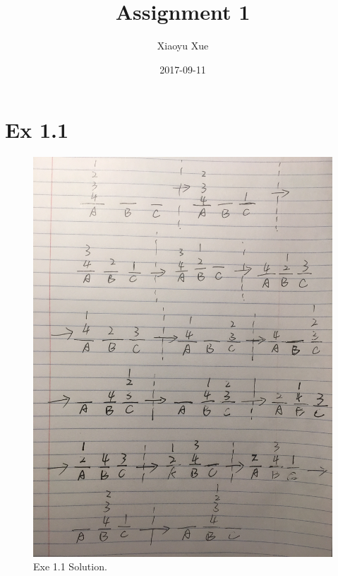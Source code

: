 

\title{Assignment 1}
\date{2017-09-11}
\author{Xiaoyu Xue}

\renewcommand{\thesubsection}{\thesection.\alph{subsection}}
\renewcommand{\thesection}{\arabic{section}}


\maketitle

\section{Ex 1.1}

\begin{figure}[h!]
  \includegraphics[width=\linewidth, angle = -90]{1.jpeg}
  \caption{Exe 1.1 Solution.}
  \label{fig:solution 1.1}
\end{figure}


